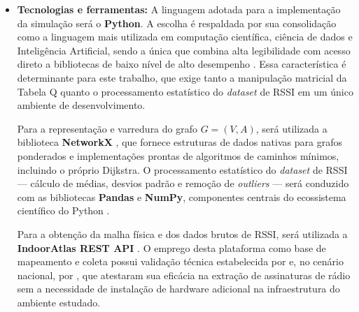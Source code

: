 \documentclass[
    12pt,                %
    openright,           %
    oneside,             %
    a4paper,             %
    english,             %
    brazil               %
]{abntex2}
\begin{document}
\begin{itemize}
\begin{enumerate}
        \item \textbf{Motor Estocástico --- \textit{Q-Learning}}: Recebe o grafo e
        os limites empíricos $RSSI_{min}(u,v)$ e $RSSI_{max}(u,v)$ de cada aresta.
        Durante a fase de treinamento, simula um Ambiente Dinâmico amostrando os
        valores de RSSI a partir de $U(RSSI_{min}(u,v), RSSI_{max}(u,v))$ a cada
        episódio, conforme descrito na Seção 2.3.2. Após a convergência da Tabela Q,
        executa a fase de inferência para os mesmos pares origem-destino utilizados
        pelo Dijkstra. %
    \end{enumerate}

\item \textbf{Tecnologias e ferramentas:} A linguagem adotada para a implementação
da simulação será o \textbf{Python}. A escolha é respaldada por sua consolidação
como a linguagem mais utilizada em computação científica, ciência de dados e
Inteligência Artificial, sendo a única que combina alta legibilidade com acesso
direto a bibliotecas de baixo nível de alto desempenho \cite{Raschka2020}. Essa
característica é determinante para este trabalho, que exige tanto a manipulação
matricial da Tabela Q quanto o processamento estatístico do \textit{dataset} de
RSSI em um único ambiente de desenvolvimento.

Para a representação e varredura do grafo $G = (V, A)$, será utilizada a biblioteca
\textbf{NetworkX} \cite{Hagberg2008}, que fornece estruturas de dados nativas para
grafos ponderados e implementações prontas de algoritmos de caminhos mínimos,
incluindo o próprio Dijkstra. O processamento estatístico do \textit{dataset} de
RSSI --- cálculo de médias, desvios padrão e remoção de \textit{outliers} ---
será conduzido com as bibliotecas \textbf{Pandas} e \textbf{NumPy}, componentes
centrais do ecossistema científico do Python \cite{Raschka2020}.

Para a obtenção da malha física e dos dados brutos de RSSI, será utilizada a
\textbf{IndoorAtlas REST API} \cite{IndoorAtlas2025}. O emprego desta plataforma
como base de mapeamento e coleta possui validação técnica estabelecida por
 e, no cenário nacional, por , que
atestaram sua eficácia na extração de assinaturas de rádio sem a necessidade de
instalação de hardware adicional na infraestrutura do ambiente estudado.


\end{itemize}
\end{document}
